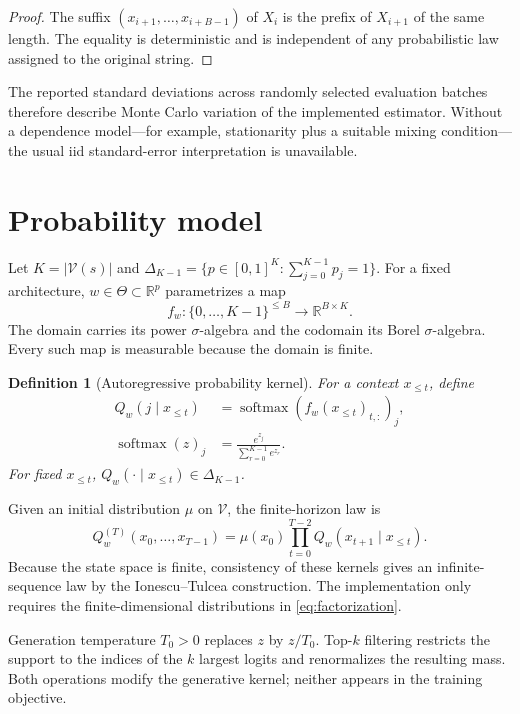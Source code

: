 \documentclass[11pt]{article}
\newtheorem{definition}{Definition}[section]
\newcommand{\V}{\mathcal V}
\newcommand{\R}{\mathbb R}
\newcommand{\1}{\mathbf 1}
\newcommand{\softmax}{\operatorname{softmax}}
\begin{document}
\begin{proof}
The suffix $(x_{i+1},\ldots,x_{i+B-1})$ of $X_i$ is the prefix of
$X_{i+1}$ of the same length. The equality is deterministic and is independent
of any probabilistic law assigned to the original string.
\end{proof}

The reported standard deviations across randomly selected evaluation batches
therefore describe Monte Carlo variation of the implemented estimator. Without
a dependence model---for example, stationarity plus a suitable mixing
condition---the usual iid standard-error interpretation is unavailable.

\section{Probability model}

Let $K=|\V(s)|$ and
$\Delta_{K-1}=\{p\in[0,1]^K:\sum_{j=0}^{K-1}p_j=1\}$. For a fixed architecture,
$w\in\Theta\subset\R^p$ parametrizes a map
\[
 f_w:\{0,\ldots,K-1\}^{\le B}\longrightarrow\R^{B\times K}.
\]
The domain carries its power $\sigma$-algebra and the codomain its Borel
$\sigma$-algebra. Every such map is measurable because the domain is finite.

\begin{definition}[Autoregressive probability kernel]
For a context $x_{\le t}$, define
\begin{align}
 Q_w(j\mid x_{\le t})
   &=\softmax(f_w(x_{\le t})_{t,:})_j,\\
 \softmax(z)_j&=\frac{e^{z_j}}{\sum_{r=0}^{K-1}e^{z_r}}.
\end{align}
For fixed $x_{\le t}$, $Q_w(\cdot\mid x_{\le t})\in\Delta_{K-1}$.
\end{definition}

Given an initial distribution $\mu$ on $\V$, the finite-horizon law is
\begin{equation}
 Q_w^{(T)}(x_0,\ldots,x_{T-1})
 =\mu(x_0)\prod_{t=0}^{T-2}Q_w(x_{t+1}\mid x_{\le t}).
 \label{eq:factorization}
\end{equation}
Because the state space is finite, consistency of these kernels gives an
infinite-sequence law by the Ionescu--Tulcea construction. The implementation
only requires the finite-dimensional distributions in
\eqref{eq:factorization}.

Generation temperature $T_0>0$ replaces $z$ by $z/T_0$. Top-$k$ filtering
restricts the support to the indices of the $k$ largest logits and renormalizes
the resulting mass. Both operations modify the generative kernel; neither
appears in the training objective.
\end{document}
